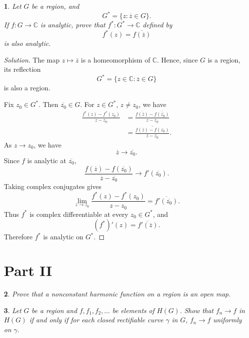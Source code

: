 \documentclass[12pt, a4paper]{report}
\theoremstyle{spaced}
\newtheorem{exercise}{}
\begin{document}
\begin{exercise}
	Let \(G\) be a region, and
	\[
		G^*=\{z:\overline{z}\in G\}.
	\]
	If \(f:G\to\mathbb{C}\) is analytic, prove that \(f^*:G^*\to\mathbb{C}\)
	defined by
	\[
		f^*(z)=\overline{f(\overline{z})}
	\]
	is also analytic.
\end{exercise}
\begin{proof}[Solution]
	The map \(z\mapsto \overline z\) is a homeomorphism of \(\mathbb C\).
	Hence, since \(G\) is a region, its reflection
	\[
		G^*=\{z\in\mathbb C:\overline z\in G\}
	\]
	is also a region.

	Fix \(z_0\in G^*\). Then \(\overline{z_0}\in G\). For \(z\in G^*\),
	\(z\neq z_0\), we have
	\[
		\begin{aligned}
			\frac{f^*(z)-f^*(z_0)}{z-z_0}
			 & =
			\frac{\overline{f(\overline z)}
				-\overline{f(\overline{z_0})}}
			{z-z_0} \\
			 & =
			\overline{
				\frac{f(\overline z)-f(\overline{z_0})}
				{\overline z-\overline{z_0}}
			}.
		\end{aligned}
	\]
	As \(z\to z_0\), we have
	\[
		\overline z\to \overline{z_0}.
	\]
	Since \(f\) is analytic at \(\overline{z_0}\),
	\[
		\frac{f(\overline z)-f(\overline{z_0})}
		{\overline z-\overline{z_0}}
		\longrightarrow f'(\overline{z_0}).
	\]
	Taking complex conjugates gives
	\[
		\lim_{z\to z_0}
		\frac{f^*(z)-f^*(z_0)}{z-z_0}
		=
		\overline{f'(\overline{z_0})}.
	\]
	Thus \(f^*\) is complex differentiable at every \(z_0\in G^*\), and
	\[
		(f^*)'(z)=\overline{f'(\overline z)}.
	\]
	Therefore \(f^*\) is analytic on \(G^*\).
\end{proof}

\section{Part II}
\begin{exercise}
	Prove that a nonconstant harmonic function on a region is an open map.
\end{exercise}

\begin{exercise}
	Let \(G\) be a region and \(f,f_1,f_2,\ldots\) be elements of \(H(G)\). Show
	that \(f_n\to f\) in \(H(G)\) if and only if for each closed rectifiable curve
	\(\gamma\) in \(G\), \(f_n\to f\) uniformly on \(\gamma\).
\end{exercise}
\end{document}
